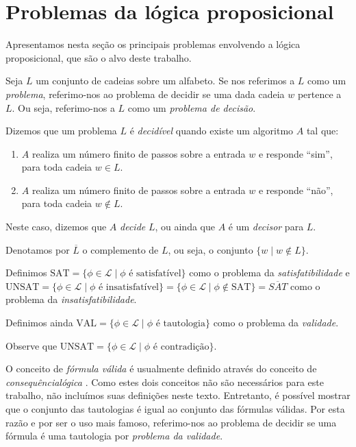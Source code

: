 \section{Problemas da lógica proposicional}
\label{problemas_da_logica}

\indent

Apresentamos nesta seção os principais problemas envolvendo a lógica proposicional, que são o alvo deste trabalho.

\begin{definition}
	Seja $L$ um conjunto de cadeias sobre um alfabeto. Se nos referimos a $L$ como um \emph{problema}, referimo-nos ao problema de decidir se uma dada cadeia $w$ pertence a $L$. Ou seja, referimo-nos a $L$ como um \emph{problema de decisão}.
	
	Dizemos que um problema $L$ é \emph{decidível} quando existe um algoritmo $A$ tal que:
	\begin{enumerate}
		\item $A$ realiza um número finito de passos sobre a entrada $w$ e responde ``sim'', para toda cadeia $w \in L$.
		\item $A$ realiza um número finito de passos sobre a entrada $w$ e responde ``não'', para toda cadeia $w \notin L$.
	\end{enumerate}
	Neste caso, dizemos que $A$ \emph{decide} $L$, ou ainda que $A$ é um \emph{decisor} para $L$.
	
	Denotamos por $\overline{L}$ o complemento de $L$, ou seja, o conjunto $\{w \mid w \notin L \}$.
\end{definition}

\begin{definition}
	Definimos $\text{SAT} = \{\phi \in \mathcal{L} \mid \phi \text{ é satisfatível} \}$ como o problema da \emph{satisfatibilidade} e $\text{UNSAT} = \{\phi \in \mathcal{L} \mid \phi \text{ é insatisfatível} \} = \{\phi \in \mathcal{L} \mid \phi \notin \text{SAT} \} = \overline{SAT}$ como o problema da \emph{insatisfatibilidade}.
	
	Definimos ainda $\text{VAL} = \{\phi \in \mathcal{L} \mid \phi \text{ é tautologia} \}$ como o problema da \emph{validade}.
	
	Observe que $\text{UNSAT} = \{\phi \in \mathcal{L} \mid \phi \text{ é contradição} \}$.
\end{definition}

O conceito de \emph{fórmula válida} é usualmente definido através do conceito de \emph{consequência\break lógica} \cite{kleene68book}. Como estes dois conceitos não são necessários para este trabalho, não incluímos suas definições neste texto. Entretanto, é possível mostrar que o conjunto das tautologias é igual ao conjunto das fórmulas válidas. Por esta razão e por ser o uso mais famoso, referimo-nos ao problema de decidir se uma fórmula é uma tautologia por \emph{problema da validade}.

